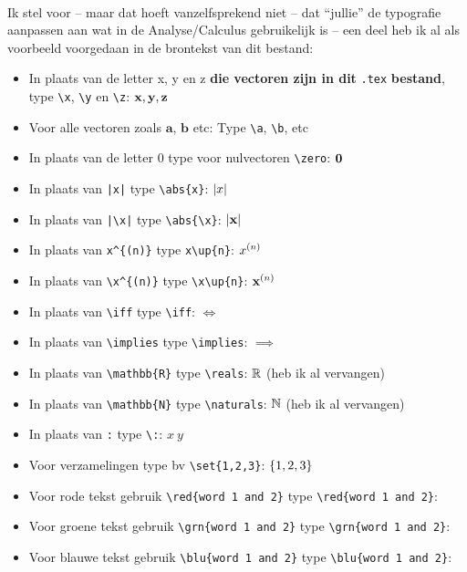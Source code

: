 \documentclass{2wa40summary}
\begin{document}
		\ \\
		Ik stel voor -- maar dat hoeft vanzelfsprekend niet -- dat ``jullie'' de typografie aanpassen aan wat in de Analyse/Calculus gebruikelijk is -- een deel heb ik al als voorbeeld voorgedaan in de brontekst van dit bestand:
		\begin{itemize}
			\item In plaats van de letter x, y en z \textbf{die vectoren zijn in dit} \verb$.tex$ \textbf{bestand}, type
			\verb$\x$, \verb$\y$ en \verb$\z$: ${\textbf{x}}, {\textbf{y}}, {\textbf{z}}$
			\item Voor alle vectoren zoals $\mathbf{a}$, $\mathbf{b}$ etc: Type \verb$\a$, \verb$\b$, etc
			\item In plaats van de letter 0 type voor nulvectoren \verb$\zero$: ${\textbf{0}}$
			\item In plaats van \verb$|x|$ type \verb$\abs{x}$: ${\left|x\right|}$
			\item In plaats van \verb$|\x|$ type \verb$\abs{\x}$: ${\left|{\textbf{x}}\right|}$
			\item In plaats van \verb$x^{(n)}$ type \verb$x\up{n}$: $x^{(n)}$
			\item In plaats van \verb$\x^{(n)}$ type \verb$\x\up{n}$: ${\textbf{x}}^{(n)}$
			\item In plaats van \verb$\iff$ type \verb$\iff$: $\iff$
			\item In plaats van \verb$\implies$ type \verb$\implies$: $\implies$
			\item In plaats van \verb$\mathbb{R}$ type \verb$\reals$: $\mathbb{R}$ (heb ik al vervangen)
			\item In plaats van \verb$\mathbb{N}$ type \verb$\naturals$: $\mathbb{N}$ (heb ik al vervangen)
			\item In plaats van \verb$:$ type \verb$\:$: $x\: y$
			\item Voor verzamelingen type bv \verb$\set{1,2,3}$: $\lbrace1,2,3\rbrace$
			\item Voor rode tekst gebruik \verb$$ type \verb$\red{word 1 and 2}$: \red{word 1 and 2}
			\item Voor groene tekst gebruik \verb$$ type \verb$\grn{word 1 and 2}$: \grn{word 1 and 2}
			\item Voor blauwe tekst gebruik \verb$$ type \verb$\blu{word 1 and 2}$: \blu{word 1 and 2}

\end{itemize}
\end{document}
